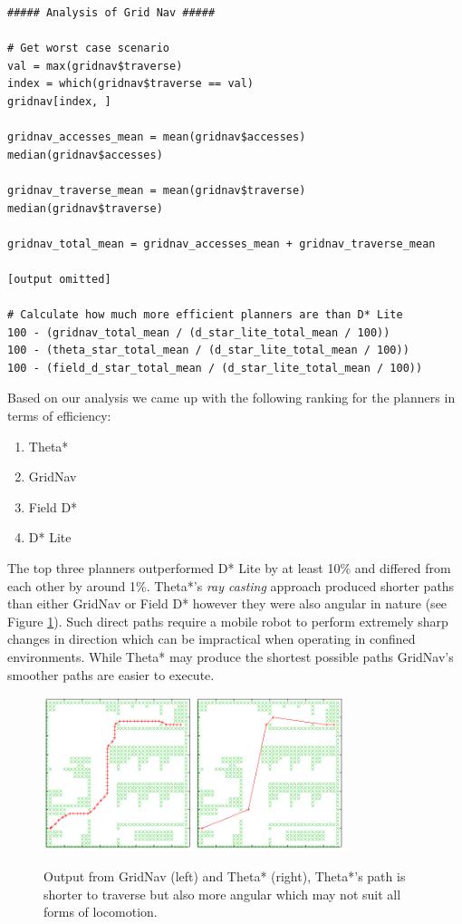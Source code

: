 \begin{lstlisting}
##### Analysis of Grid Nav #####

# Get worst case scenario
val = max(gridnav$traverse)
index = which(gridnav$traverse == val)
gridnav[index, ]

gridnav_accesses_mean = mean(gridnav$accesses)
median(gridnav$accesses)

gridnav_traverse_mean = mean(gridnav$traverse)
median(gridnav$traverse)

gridnav_total_mean = gridnav_accesses_mean + gridnav_traverse_mean

[output omitted]

# Calculate how much more efficient planners are than D* Lite
100 - (gridnav_total_mean / (d_star_lite_total_mean / 100))
100 - (theta_star_total_mean / (d_star_lite_total_mean / 100))
100 - (field_d_star_total_mean / (d_star_lite_total_mean / 100))
\end{lstlisting}

\noindent
Based on our analysis we came up with the following ranking for the planners in terms of efficiency:

\begin{enumerate}
\item Theta*
\item GridNav
\item Field D*
\item D* Lite
\end{enumerate}

\noindent
The top three planners outperformed D* Lite by at least 10\% and differed from each other by around 1\%. Theta*'s \textit{ray casting} approach produced shorter paths than either GridNav or Field D* however they were also angular in nature (see Figure \ref{floor_plan}). Such direct paths require a mobile robot to perform extremely sharp changes in direction which can be impractical when operating in confined environments. While Theta* may produce the shortest possible paths GridNav's smoother paths are easier to execute.

\begin{figure}[htbp]

\center \includegraphics[width=250pt]{illustrations/comparison}\\
\caption{Output from GridNav (left) and Theta* (right), Theta*'s path is shorter to traverse but also more angular which may not suit all forms of locomotion.} 
\label{floor_plan}

\end{figure}

